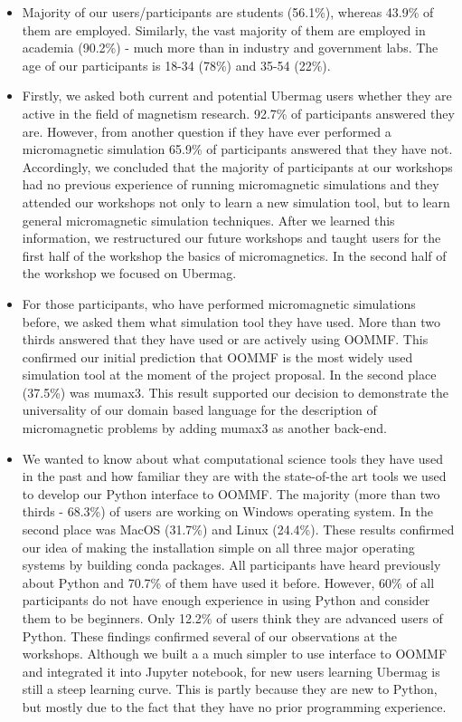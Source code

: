 \documentclass{deliverablereport}
\begin{document}
\begin{itemize}
  \item Majority of our users/participants are students (56.1\%), whereas 43.9\% of them are employed. Similarly, the vast majority of them are employed in academia (90.2\%) - much more than in industry and government labs. The age of our participants is 18-34 (78\%) and 35-54 (22\%). 
\item Firstly, we asked both current and potential Ubermag users whether they are active in the field of magnetism research. 92.7\% of participants answered they are. However, from another question if they have ever performed a micromagnetic simulation 65.9\% of participants answered that they have not. Accordingly, we concluded that the majority of participants at our workshops had no previous experience of running micromagnetic simulations and they attended our workshops not only to learn a new simulation tool, but to learn general micromagnetic simulation techniques. After we learned this information, we restructured our future workshops and taught users for the first half of the workshop the basics of micromagnetics. In the second half of the workshop we focused on Ubermag.
\item For those participants, who have performed micromagnetic simulations before, we asked them what simulation tool they have used. More than two thirds answered that they have used or are actively using OOMMF. This confirmed our initial prediction that OOMMF is the most widely used simulation tool at the moment of the project proposal. In the second place (37.5\%) was mumax3. This result supported our decision to demonstrate the universality of our domain based language for the description of micromagnetic problems by adding mumax3 as another back-end.
\item We wanted to know about what computational science tools they have used in the past and how familiar they are with the state-of-the art tools we used to develop our Python interface to OOMMF. The majority (more than two thirds - 68.3\%) of users are working on Windows operating system. In the second place was MacOS (31.7\%) and Linux (24.4\%). These results confirmed our idea of making the installation simple on all three major operating systems by building conda packages. All participants have heard previously about Python and 70.7\% of them have used it before. However, 60\% of all participants do not have enough experience in using Python and consider them to be beginners. Only 12.2\% of users think they are advanced users of Python. These findings confirmed several of our observations at the workshops. Although we built a a much simpler to use interface to OOMMF and integrated it into Jupyter notebook, for new users learning Ubermag is still a steep learning curve. This is partly because they are new to Python, but mostly due to the fact that they have no prior programming experience.

\end{itemize}
\end{document}
